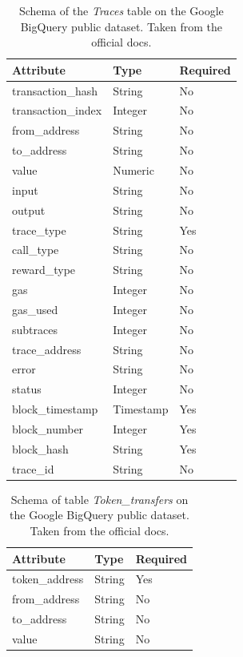 \begin{table}[H]
\centering
    \begin{tabular}  { m{6cm} m{3cm} m{3cm} } 
    \toprule
    \textbf{Attribute} & \textbf{Type} & \textbf{Required} \\
    \midrule
    transaction\_hash & String &	No	\\			
    transaction\_index & Integer	& No	\\			
    from\_address & String &	No \\	
    to\_address & String & No \\				
    value & Numeric &	No		\\		
    input & String &	No		\\		
    output & String	& No		\\		
    trace\_type & String &	Yes		\\		
    call\_type & String	& No	\\
    reward\_type & String	& No\\
    gas & Integer	& No\\
    gas\_used & Integer	& No\\
    subtraces & Integer	& No\\
    trace\_address & String	& No		\\
    error & String	& No		\\
    status & Integer	& No	\\		
    block\_timestamp & Timestamp	& Yes		\\		
    block\_number & Integer	& Yes			\\	
    block\_hash & String	& Yes	\\			
    trace\_id & String	& No \\
    \bottomrule
\end{tabular}
\caption[Google BigQuery \texttt{Traces} table]{Schema of the \textit{Traces} table on the Google BigQuery public dataset. Taken from the official docs.}
\label{table:bigquery-traces}
\end{table}

\begin{table}[H]
\centering
    \begin{tabular}  { m{6cm} m{3cm} m{3cm} } 
    \toprule
    \textbf{Attribute} & \textbf{Type} & \textbf{Required} \\
    \midrule
    token\_address & String & Yes	 \\			
    from\_address & String & No \\
    to\_address & String	& No	\\			
    value & String	& No	\\
    \bottomrule
\end{tabular}
\caption[Google BigQuery \texttt{Token\_transfers} table]{Schema of table \textit{Token\_transfers} on the Google BigQuery public dataset. Taken from the official docs.}
\label{table:bigquery-transfers}
\end{table}

